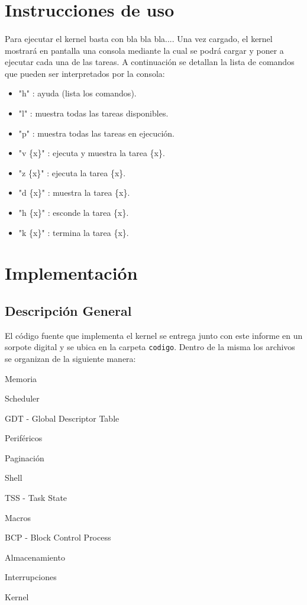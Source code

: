 \documentclass[11pt, a4paper]{article}
\begin{document}
		
\section{Instrucciones de uso}
\paragraph{}
Para ejecutar el kernel basta con bla bla bla.... Una vez cargado, el kernel mostrará en pantalla una consola mediante la cual se podrá cargar y poner a ejecutar cada una de las tareas. A continuación se detallan la lista de comandos que pueden ser interpretados por la consola:
\begin{itemize}
    \item "h" : ayuda (lista los comandos).
 	\item "l" : muestra todas las tareas disponibles.
 	\item "p" : muestra todas las tareas en ejecuci\'on.
 	\item "v \{x\}" : ejecuta y muestra la tarea \{x\}.
 	\item "z \{x\}" : ejecuta la tarea \{x\}.
 	\item "d \{x\}" : muestra la tarea \{x\}.
 	\item "h \{x\}" : esconde la tarea \{x\}.
 	\item "k \{x\}" : termina la tarea \{x\}.

\end{itemize}


\section{Implementación}
	\subsection{Descripción General}
	El código fuente que implementa el kernel se entrega junto con este informe en un sorpote digital y se ubica en la carpeta \texttt{codigo}. Dentro de la misma los archivos se organizan de la siguiente manera:
	\begin{center}
		\begin{shortitemize}
			\setlength{\shortitemwidth}{200pt}
			\item Memoria
			\item Scheduler
			\item GDT - Global Descriptor Table
			\item Periféricos
			\item Paginación				
			\item Shell
			\item TSS - Task State
			\item Macros
			\item BCP - Block Control Process
			\item Almacenamiento
			\item Interrupciones							
			\item Kernel
		\end{shortitemize}
	\end{center}		
\end{document}
